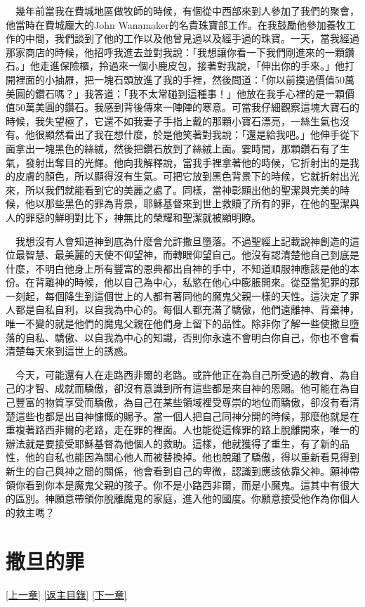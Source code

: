 \documentclass{book}
\begin{document}
　幾年前當我在費城地區做牧師的時候，有個從中西部來到人參加了我們的聚會，他當時在費城龐大的John Wanamaker的名貴珠寶部工作。在我鼓勵他參加養牧工作的中間，我們談到了他的工作以及他曾見過以及經手過的珠寶。一天，當我經過那家商店的時候，他招呼我進去並對我說：「我想讓你看一下我們剛進來的一顆鑽石。」他走進保險櫃，拎過來一個小鹿皮包，接著對我說，「伸出你的手來。」他打開裡面的小抽屜，把一塊石頭放進了我的手裡，然後問道：「你以前摸過價值50萬美圓的鑽石嗎？」我答道：「我不太常碰到這種事！」他放在我手心裡的是一顆價值50萬美圓的鑽石。我感到背後傳來一陣陣的寒意。可當我仔細觀察這塊大寶石的時候，我失望極了，它還不如我妻子手指上戴的那顆小寶石漂亮，一絲生氣也沒有。他很顯然看出了我在想什麼，於是他笑著對我說：「還是給我吧。」他伸手從下面拿出一塊黑色的絲絨，然後把鑽石放到了絲絨上面。霎時間，那顆鑽石有了生氣，發射出奪目的光輝。他向我解釋說，當我手裡拿著他的時候，它折射出的是我的皮膚的顏色，所以顯得沒有生氣。可把它放到黑色背景下的時候，它就折射出光來，所以我們就能看到它的美麗之處了。同樣，當神彰顯出他的聖潔與完美的時候，他以那些黑色的罪為背景，耶穌基督來到世上救贖了所有的罪，在他的聖潔與人的罪惡的鮮明對比下，神無比的榮耀和聖潔就被顯明瞭。

　我想沒有人會知道神到底為什麼會允許撒旦墮落。不過聖經上記載說神創造的這位最智慧、最美麗的天使不仰望神，而轉眼仰望自己。他沒有認清楚他自己到底是什麼，不明白他身上所有豐富的恩典都出自神的手中，不知道順服神應該是他的本份。在背離神的時候，他以自己為中心，私慾在他心中膨脹開來。從亞當犯罪的那一刻起，每個降生到這個世上的人都有著同他的魔鬼父親一樣的天性。這決定了罪人都是自私自利，以自我為中心的。每個人都充滿了驕傲，他們遠離神、背棄神，唯一不變的就是他們的魔鬼父親在他們身上留下的品性。除非你了解一些使撒旦墮落的自私、驕傲、以自我為中心的知識，否則你永遠不會明白你自己，你也不會看清楚每天來到這世上的誘惑。

　今天，可能還有人在走路西非爾的老路。或許他正在為自己所受過的教育、為自己的才智、成就而驕傲，卻沒有意識到所有這些都是來自神的恩賜。他可能在為自己豐富的物質享受而驕傲，為自己在某些領域裡受尊崇的地位而驕傲，卻沒有看清楚這些也都是出自神慷慨的賜予。當一個人把自己同神分開的時候，那麼他就是在重複著路西非爾的老路，走在罪的裡面。人也能從這條罪的路上脫離開來，唯一的辦法就是要接受耶穌基督為他個人的救助。這樣，他就獲得了重生，有了新的品性，他的自私也能因為關心他人而被替換掉。他也脫離了驕傲，得以重新看見得到新生的自己與神之間的關係，他會看到自己的卑微，認識到應該依靠父神。願神帶領你看到你本是魔鬼父親的孩子。你不是小路西非爾，而是小魔鬼。這其中有很大的區別。神願意帶領你脫離魔鬼的家庭，進入他的國度。你願意接受他作為你個人的救主嗎？

\chapter{撒旦的罪}
\label{sec:ch02}
\hyperref[sec:ch01]{[上一章]}
\hyperlink{toc}{[返主目錄]}
\hyperref[sec:ch03]{[下一章]}
\end{document}
